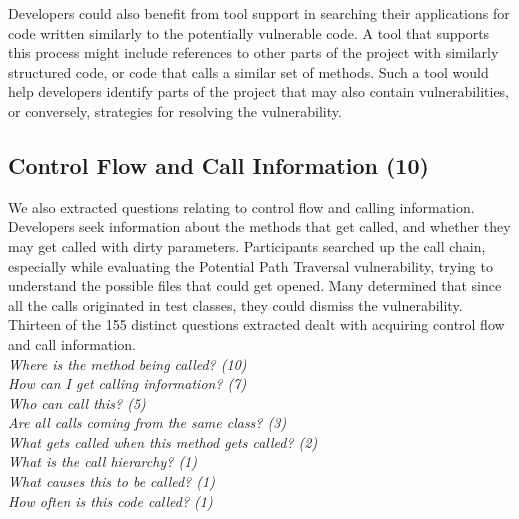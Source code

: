 \documentclass[conference]{IEEEtran}
\begin{document}
Developers could also benefit from tool support in searching their applications for code written similarly to the potentially vulnerable code. 
A tool that supports this process might include references to other parts of the project with similarly structured code, or code that calls a similar set of methods. 
Such a tool would help developers identify parts of the project that may also contain vulnerabilities, or conversely, strategies for resolving the vulnerability.



\noindent\subsection{\textbf{Control Flow and Call Information (10)}}\label{cf}
We also extracted questions relating to control flow and calling information. 
Developers seek information about the methods that get called, and whether they may get called with dirty parameters.
Participants searched up the call chain, especially while evaluating the Potential Path Traversal vulnerability, trying to understand the possible files that could get opened. 
Many determined that since all the calls originated in test classes, they could dismiss the vulnerability.
Thirteen of the 155 distinct questions extracted dealt with acquiring control flow and call information.
\\


\noindent\emph{Where is the method being called? (10)} \\
\emph{How can I get calling information? (7)} \\
\emph{Who can call this? (5)} \\
\emph{Are all calls coming from the same class? (3)} \\
\emph{What gets called when this method gets called? (2)} \\
\emph{What is the call hierarchy? (1)} \\
\emph{What causes this to be called? (1)} \\
\emph{How often is this code called? (1)} \\
\end{document}
